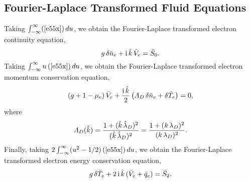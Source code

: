 \documentclass[12pt,prb,aps]{revtex4-1}
\begin{document}
\subsection{Fourier-Laplace Transformed Fluid Equations}
Taking $\int_{-\infty}^\infty (\ref{e55x})\,du$, we obtain the Fourier-Laplace transformed electron continuity equation,
\begin{equation}\label{e34}
g\,\delta\bar{n}_e+{\rm i}\,\hat{k}\,\bar{V}_e =\bar{S}_0.
\end{equation}
Taking $\int_{-\infty}^\infty u\,(\ref{e55x})\,du$, we obtain the Fourier-Laplace transformed electron momentum conservation equation,
\begin{equation}\label{e35}
(g+1-\mu_e)\,\bar{V}_e +\frac{{\rm i}\,\hat{k}}{2}\left({\mit\Lambda}_D\,\delta\bar{n}_e+\delta\bar{T}_e\right)=0,
\end{equation}
where
\begin{equation}
{\mit\Lambda}_D (\hat{k})= \frac{1+(\hat{k}\,\hat{\lambda}_D)^2}{(\hat{k}\,\hat{\lambda}_D)^2}= \frac{1+(k\,\lambda_D)^2}{(k\,\lambda_D)^2}.
\end{equation}
Finally, taking $2\int_{-\infty}^\infty(u^2-1/2)\,(\ref{e55x})\,du$, we obtain the Fourier-Laplace transformed electron energy conservation equation,
\begin{equation}\label{e36}
g\,\delta\bar{T}_e+ 2\,{\rm i}\,\hat{k}\,(\bar{V}_e+\bar{q}_e) =\bar{S}_2.
\end{equation}
\end{document}
